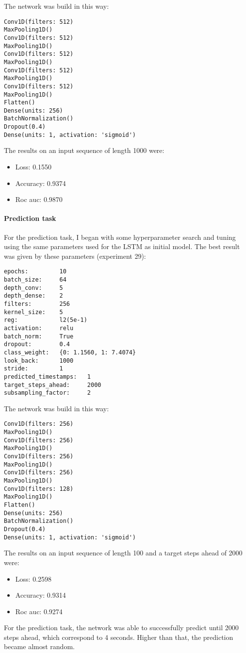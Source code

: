 
The network was build in this way:

\begin{lstlisting}
Conv1D(filters: 512)
MaxPooling1D()
Conv1D(filters: 512)
MaxPooling1D()
Conv1D(filters: 512)
MaxPooling1D()
Conv1D(filters: 512)
MaxPooling1D()
Conv1D(filters: 512)
MaxPooling1D()
Flatten()
Dense(units: 256)
BatchNormalization()
Dropout(0.4)
Dense(units: 1, activation: 'sigmoid')
\end{lstlisting}

The results on an input sequence of length 1000 were:

\begin{itemize}
    \item Loss: 0.1550
    \item Accuracy: 0.9374
    \item Roc auc: 0.9870
\end{itemize}

\paragraph{Prediction task} For the prediction task, I began with some hyperparameter search and tuning using the same parameters used for the LSTM as initial model. The best result was given by these parameters (experiment 29):
\begin{lstlisting}
epochs:			10
batch_size:		64
depth_conv:		5
depth_dense:	2
filters:        256
kernel_size:	5
reg:            l2(5e-1)
activation:		relu
batch_norm:		True
dropout:        0.4
class_weight:	{0: 1.1560, 1: 7.4074}
look_back:		1000
stride:			1
predicted_timestamps:	1
target_steps_ahead:		2000
subsampling_factor:		2
\end{lstlisting}

The network was build in this way:

\begin{lstlisting}
Conv1D(filters: 256)
MaxPooling1D()
Conv1D(filters: 256)
MaxPooling1D()
Conv1D(filters: 256)
MaxPooling1D()
Conv1D(filters: 256)
MaxPooling1D()
Conv1D(filters: 128)
MaxPooling1D()
Flatten()
Dense(units: 256)
BatchNormalization()
Dropout(0.4)
Dense(units: 1, activation: 'sigmoid')
\end{lstlisting}

The results on an input sequence of length 100 and a target steps ahead of 2000 were:

\begin{itemize}
    \item Loss: 0.2598
    \item Accuracy: 0.9314
    \item Roc auc: 0.9274
\end{itemize}

For the prediction task, the network was able to successfully predict until 2000 steps ahead, which correspond to 4 seconds. Higher than that, the prediction became almost random.




